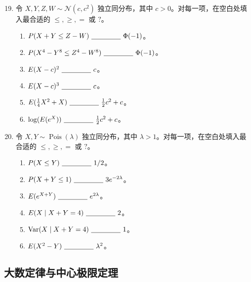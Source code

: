 \documentclass[UTF8,12pt,a4paper,fontset=fandol]{ctexart}
\begin{document}
\begin{enumerate}
  \setcounter{enumi}{18}
  \item 令 $X,Y,Z,W\sim\mathcal N(c,c^2)$ 独立同分布，其中 $c>0$。对每一项，在空白处填入最合适的 $\le,\ge,=$ 或 $?$。
  \begin{enumerate}
    \item $P(X+Y\le Z-W)\ \underline{\hspace{1.5cm}}\ \Phi(-1)$。
    \item $P(X^4-Y^8\le Z^4-W^8)\ \underline{\hspace{1.5cm}}\ \Phi(-1)$。
    \item $E(X-c)^2\ \underline{\hspace{1.5cm}}\ c$。
    \item $E(X-c)^3\ \underline{\hspace{1.5cm}}\ c$。
    \item $E(\frac14X^2+X)\ \underline{\hspace{1.5cm}}\ \frac12c^2+c$。
    \item $\log(E(e^X))\ \underline{\hspace{1.5cm}}\ \frac12c^2+c$。
  \end{enumerate}

  \item 令 $X,Y\sim\operatorname{Pois}(\lambda)$ 独立同分布，其中 $\lambda>1$。对每一项，在空白处填入最合适的 $\le,\ge,=$ 或 $?$。
  \begin{enumerate}
    \item $P(X\le Y)\ \underline{\hspace{1.5cm}}\ 1/2$。
    \item $P(X+Y\le 1)\ \underline{\hspace{1.5cm}}\ 3e^{-2\lambda}$。
    \item $E(e^{X+Y})\ \underline{\hspace{1.5cm}}\ e^{2\lambda}$。
    \item $E(X\mid X+Y=4)\ \underline{\hspace{1.5cm}}\ 2$。
    \item $\operatorname{Var}(X\mid X+Y=4)\ \underline{\hspace{1.5cm}}\ 1$。
    \item $E(X^2-Y)\ \underline{\hspace{1.5cm}}\ \lambda^2$。
  \end{enumerate}
\end{enumerate}

\subsection*{大数定律与中心极限定理}
\end{document}
